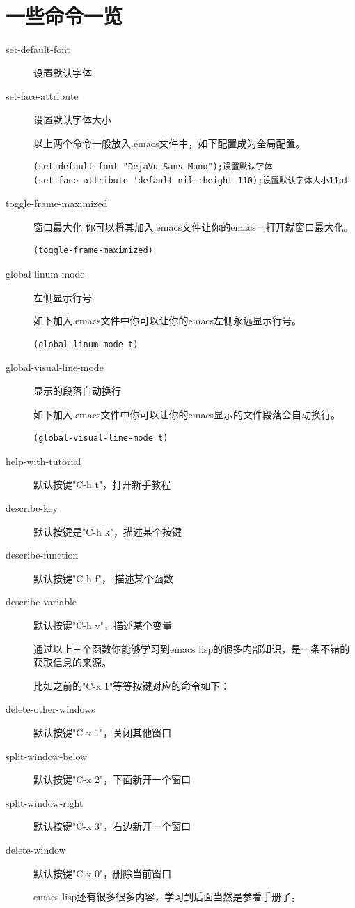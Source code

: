 \documentclass[11pt,oneside]{book}
\begin{document}
\section{一些命令一览}
\begin{description}
\item[set-default-font] 设置默认字体 
\item[set-face-attribute] 设置默认字体大小

以上两个命令一般放入.emacs文件中，如下配置成为全局配置。
\begin{Verbatim}
(set-default-font "DejaVu Sans Mono");设置默认字体
(set-face-attribute 'default nil :height 110);设置默认字体大小11pt
\end{Verbatim}

\item[toggle-frame-maximized] 窗口最大化
你可以将其加入.emacs文件让你的emacs一打开就窗口最大化。
\begin{Verbatim}
(toggle-frame-maximized)
\end{Verbatim}

\item[global-linum-mode] 左侧显示行号

如下加入.emacs文件中你可以让你的emacs左侧永远显示行号。
\begin{Verbatim}
(global-linum-mode t)
\end{Verbatim}

\item[global-visual-line-mode] 显示的段落自动换行

如下加入.emacs文件中你可以让你的emacs显示的文件段落会自动换行。
\begin{Verbatim}
(global-visual-line-mode t)
\end{Verbatim}

\item[help-with-tutorial] 默认按键"C-h t"，打开新手教程

\item[describe-key] 默认按键是"C-h k"，描述某个按键
\item[describe-function] 默认按键"C-h f"， 描述某个函数
\item[describe-variable] 默认按键"C-h v"，描述某个变量

通过以上三个函数你能够学习到emacs lisp的很多内部知识，是一条不错的获取信息的来源\cite{redguardtoo}。

比如之前的"C-x 1"等等按键对应的命令如下：
\item[delete-other-windows] 默认按键"C-x 1"，关闭其他窗口
\item[split-window-below] 默认按键"C-x 2"，下面新开一个窗口
\item[split-window-right] 默认按键"C-x 3"，右边新开一个窗口
\item[delete-window] 默认按键"C-x 0"，删除当前窗口

emacs lisp还有很多很多内容，学习到后面当然是参看手册了。
\end{description}
\end{document}
